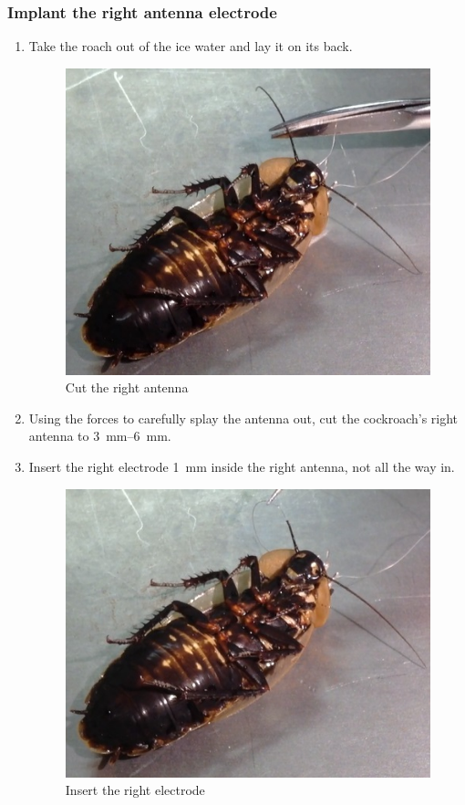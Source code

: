 \subsubsection{Implant the right antenna electrode}
\begin{enumerate}
\item Take the roach out of the ice water and lay it on its back.
\begin{figure}[ht!]
\centering
\includegraphics[scale=0.3]{Surgery Photos/cut.jpg}
\caption{Cut the right antenna}
\label{fig:cut}
\end{figure}

\item Using the forces to carefully splay the antenna out, cut the cockroach's right antenna to \SIrange{3}{6}{\milli\meter}.
\item Insert the right electrode \SI{1}{\milli\meter} inside the right antenna, not all the way in.
\begin{figure}[ht!]
\centering
\includegraphics[scale=0.3]{Surgery Photos/relectrode1.jpg}
\caption{Insert the right electrode}
\label{fig:relectrode1}
\end{figure}


\end{enumerate}

